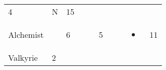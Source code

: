 \documentclass[12pt]{article}
\newcommand{\indexClass}[1]{\index{#1}}
\newcommand{\class}[1]{#1\indexClass{#1}}
\begin{document}
\begin{longtable}[]{@{}llllllllll@{}}
\begin{minipage}[t]{0.06\columnwidth}
4
\strut\end{minipage} &
\begin{minipage}[t]{0.07\columnwidth}\raggedright\strut
N
\strut\end{minipage} &
\begin{minipage}[t]{0.08\columnwidth}\raggedright\strut
15
\strut\end{minipage}\tabularnewline
\begin{minipage}[t]{0.13\columnwidth}\raggedright\strut
\class{Alchemist}
\strut\end{minipage} &
\begin{minipage}[t]{0.06\columnwidth}\raggedright\strut
\strut\end{minipage} &
\begin{minipage}[t]{0.06\columnwidth}\raggedright\strut
6
\strut\end{minipage} &
\begin{minipage}[t]{0.06\columnwidth}\raggedright\strut
\strut\end{minipage} &
\begin{minipage}[t]{0.06\columnwidth}\raggedright\strut
\strut\end{minipage} &
\begin{minipage}[t]{0.06\columnwidth}\raggedright\strut
5
\strut\end{minipage} &
\begin{minipage}[t]{0.06\columnwidth}\raggedright\strut
\strut\end{minipage} &
\begin{minipage}[t]{0.06\columnwidth}\raggedright\strut
\strut\end{minipage} &
\begin{minipage}[t]{0.07\columnwidth}\raggedright\strut
\begin{itemize}
\item
\end{itemize}
\strut\end{minipage} &
\begin{minipage}[t]{0.08\columnwidth}\raggedright\strut
11
\strut\end{minipage}\tabularnewline
\begin{minipage}[t]{0.13\columnwidth}\raggedright\strut
\class{Valkyrie}
\strut\end{minipage} &
\begin{minipage}[t]{0.06\columnwidth}\raggedright\strut
2
\strut\end{minipage} &
\begin{minipage}[t]{0.06\columnwidth}\raggedright\strut

\end{minipage}
\end{longtable}
\end{document}
